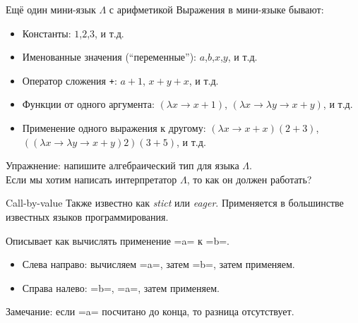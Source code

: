 \documentclass[
  xcolor={svgnames},
  hyperref={colorlinks,citecolor=DeepPink4,linkcolor=DarkRed,urlcolor=DarkBlue}]{beamer}
\begin{document}
\begin{frame}[fragile]{Ещё один мини-язык $\Lambda$ с арифметикой}
Выражения в мини-языке бывают:
\begin{itemize}
 \item Константы: $1$,$2$,$3$, и т.д.
 \item Именованные значения (``переменные''): $a$,$b$,$x$,$y$, и т.д.
 \item Оператор сложения \verb=+=: $a+1$, $x+y+x$, и т.д.
 \item Функции от одного аргумента: $(\lambda x \rightarrow x+1)$, $(\lambda x \rightarrow \lambda y \rightarrow x+y)$, и т.д.
 \item Применение одного выражения к другому: $(\lambda x \rightarrow x + x) (2+3)$, $((\lambda x \rightarrow \lambda y \rightarrow x + y) 2) (3+5)$, и т.д.
\end{itemize}
\pause
Упражнение: напишите алгебраический тип для языка $\Lambda$.\\
\pause
{\Large \faQuestion} Если мы хотим написать интерпретатор $\Lambda$, то как он должен работать?
\end{frame}

\begin{frame}[fragile]{Call-by-value}
Также известно как \textit{stict} или \textit{eager}. Применяется в большинстве известных языков программирования.
\vspace{1cm}

Описывает как вычислять применение \hsinline=a= к \hsinline=b=.
\begin{itemize}
 \item Слева направо: вычисляем \hsinline=a=, затем \hsinline=b=, затем применяем.
 \item Справа налево: \hsinline=b=, \hsinline=a=, затем применяем.
\end{itemize}

Замечание: если \hsinline=a= посчитано до конца, то разница отсутствует.
\end{frame}
\end{document}
